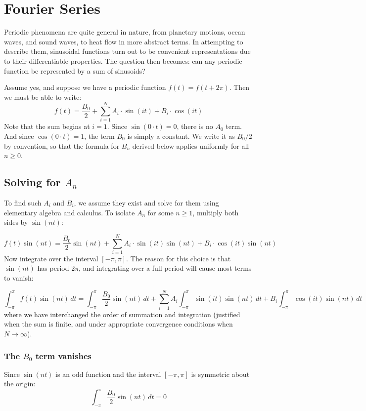 \documentclass[]{article}
\title{}
\author{}
\begin{document}
\maketitle

\section{Fourier Series}
Periodic phenomena are quite general in nature, from planetary motions, ocean waves, and sound waves, to heat flow in more abstract terms. In attempting to describe them, sinusoidal functions turn out to be convenient representations due to their differentiable properties. The question then becomes: can any periodic function be represented by a sum of sinusoids?

Assume yes, and suppose we have a periodic function $f(t) = f(t+2\pi)$. Then we must be able to write:
\[f(t) = \frac{B_0}{2} + \sum_{i = 1}^{N}A_i \cdot \sin(it) + B_i\cdot\cos(it)\]
Note that the sum begins at $i=1$. Since $\sin(0 \cdot t) = 0$, there is no $A_0$ term. And since $\cos(0 \cdot t) = 1$, the term $B_0$ is simply a constant. We write it as $B_0/2$ by convention, so that the formula for $B_n$ derived below applies uniformly for all $n \geq 0$.

\subsection{Solving for $A_n$}
To find such $A_i$ and $B_i$, we assume they exist and solve for them using elementary algebra and calculus. To isolate $A_n$ for some $n \geq 1$, multiply both sides by $\sin(nt)$:

\[f(t)\sin(nt) = \frac{B_0}{2}\sin(nt) + \sum_{i = 1}^{N}A_i \cdot \sin(it)\sin(nt) + B_i\cdot\cos(it)\sin(nt)\]
Now integrate over the interval $[-\pi, \pi]$. The reason for this choice is that $\sin(nt)$ has period $2\pi$, and integrating over a full period will cause most terms to vanish:

\[\int_{-\pi}^{\pi} f(t)\sin(nt) \, dt = \int_{-\pi}^{\pi} \frac{B_0}{2}\sin(nt)\,dt + \sum_{i = 1}^{N}A_i  \int_{-\pi}^{\pi} \sin(it)\sin(nt)\,dt + B_i \int_{-\pi}^{\pi}\cos(it)\sin(nt) \,dt\]
where we have interchanged the order of summation and integration (justified when the sum is finite, and under appropriate convergence conditions when $N \to \infty$).

\subsubsection*{The $B_0$ term vanishes}
Since $\sin(nt)$ is an odd function and the interval $[-\pi, \pi]$ is symmetric about the origin:
\[\int_{-\pi}^{\pi} \frac{B_0}{2}\sin(nt)\,dt = 0\]
\end{document}
